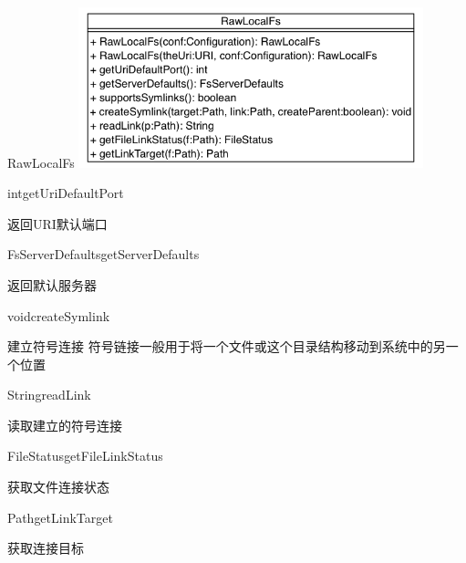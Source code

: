 \begin{XeClass}{RawLocalFs}
\includegraphics[width=10cm]{cdig/RawLocalFs.png}
    
    \begin{XeMethod}{\XeProtected}{int}{getUriDefaultPort}
         
 返回URI默认端口

    \end{XeMethod}

    \begin{XeMethod}{\XeProtected}{FsServerDefaults}{getServerDefaults}
         
 返回默认服务器

    \end{XeMethod}

    \begin{XeMethod}{\XeProtected}{void}{createSymlink}
         
 建立符号连接
 符号链接一般用于将一个文件或这个目录结构移动到系统中的另一个位置

    \end{XeMethod}

    \begin{XeMethod}{\XePrivate}{String}{readLink}
         
 读取建立的符号连接

    \end{XeMethod}

    \begin{XeMethod}{\XeProtected}{FileStatus}{getFileLinkStatus}
         
 获取文件连接状态

    \end{XeMethod}

    \begin{XeMethod}{\XeProtected}{Path}{getLinkTarget}
         
 获取连接目标

    \end{XeMethod}

\end{XeClass}
